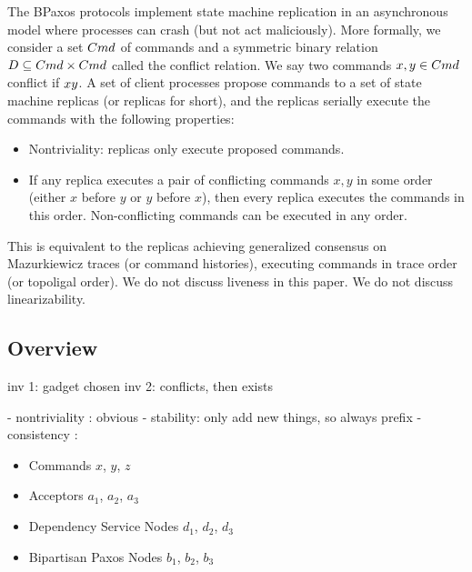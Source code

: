 The BPaxos protocols implement state machine replication in an asynchronous model where processes can crash (but not act maliciously). More formally, we consider a set $Cmd$ of commands and a symmetric binary relation $D \subseteq Cmd \times Cmd$ called the conflict relation. We say two commands $x, y \in Cmd$ conflict if $x  y$. A set of client processes propose commands to a set of state machine replicas (or replicas for short), and the replicas serially execute the commands with the following properties:

\begin{itemize}
  \item Nontriviality: replicas only execute proposed commands.
  \item If any replica executes a pair of conflicting commands $x, y$ in some order (either $x$ before $y$ or $y$ before $x$), then every replica executes the commands in this order. Non-conflicting commands can be executed in any order.
\end{itemize}

This is equivalent to the replicas achieving generalized consensus on
Mazurkiewicz traces (or command histories), executing commands in trace order
(or topoligal order). We do not discuss liveness in this paper. We do not discuss linearizability.

\subsection{Overview}

inv 1: gadget chosen
inv 2: conflicts, then exists


- nontriviality : obvious
- stability: only add new things, so always prefix
- consistency :

\begin{itemize}
  \item Commands $x$, $y$, $z$
  \item Acceptors $a_1$, $a_2$, $a_3$
  \item Dependency Service Nodes $d_1$, $d_2$, $d_3$
  \item Bipartisan Paxos Nodes $b_1$, $b_2$, $b_3$
\end{itemize}



